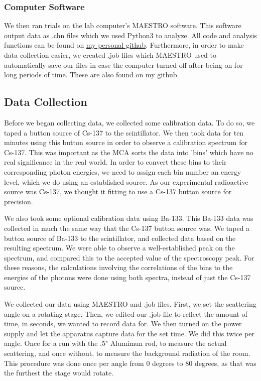 \documentclass[10pt,letterpaper,onecolumn]{article}
\begin{document}
\subsubsection*{Computer Software}
We then ran trials on the lab computer's MAESTRO software. This software output data as .chn files which we used Python3 to analyze. All code and analysis functions can be found on \href{https://github.com/adeshpande03/seniorlab}{my personal github}. Furthermore, in order to make data collection easier, we created .job files which MAESTRO used to automatically save our files in case the computer turned off after being on for long periods of time. These are also found on my github.
\subsection{Data Collection}
Before we began collecting data, we collected some calibration data. To do so, we taped a button source of Cs-137 to the scintillator. We then took data for ten minutes using this button source in order to observe a calibration spectrum for Cs-137. This was important as the MCA sorts the data into 'bins' which have no real significance in the real world. In order to convert these bins to their corresponding photon energies, we need to assign each bin number an energy level, which we do using an established source. As our experimental radioactive source was Cs-137, we thought it fitting to use a Cs-137 button source for precision. 


We also took some optional calibration data using Ba-133. This Ba-133 data was collected in much the same way that the Cs-137 button source was. We taped a button source of Ba-133 to the scintillator, and collected data based on the resulting spectrum. We were able to observe a well-established peak on the spectrum, and compared this to the accepted value of the spectroscopy peak. For these reasons, the calculations involving the correlations of the bins to the energies of the photons were done using both spectra, instead of just the Cs-137 source.


We collected our data using MAESTRO and .job files. First, we set the scattering angle on a rotating stage. Then, we edited our .job file to reflect the amount of time, in seconds, we wanted to record data for. We then turned on the power supply and let the apparatus capture data for the set time. We did this twice per angle. Once for a run with the .5" Alumimun rod, to measure the actual scattering, and once without, to measure the background radiation of the room. This procedure was done once per angle from 0 degrees to 80 degrees, as that was the furthest the stage would rotate.
\end{document}
